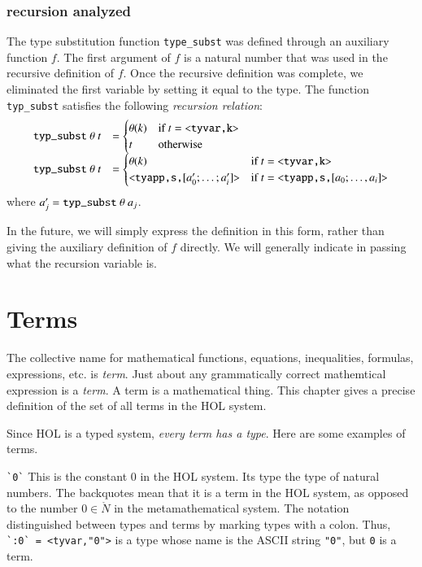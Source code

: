 \documentclass[cup9a]{cupbook}
\begin{document}
\subsection{recursion analyzed}

The type substitution function \verb!type_subst! was defined through an auxiliary function $f$.  The first
argument of $f$ is a natural number that was used in the recursive definition of $f$.  Once the recursive definition was complete, we eliminated the first variable by setting it equal to the type.  The function \verb!typ_subst! satisfies the following {\it recursion relation}:
$$
\begin{array}{lll}
\verb!typ_subst!~\theta~t &=\begin{cases} \theta(k) &\hbox{if } t = \verb!<tyvar,k>!\\ t &\hbox{otherwise}\end{cases}\\
\verb!typ_subst!~\theta~t &=\begin{cases} \theta(k) &\hbox{if } t = \verb!<tyvar,k>!\\ \verb!<tyapp,s,![a'_0;\ldots;a'_i]\verb!>! &\hbox{if } t = \verb!<tyapp,s,![a_0;\ldots,a_i]\verb!>!\end{cases}\\
\end{array}
$$
where $a'_j = \verb!typ_subst!~\theta~a_j$.

In the future, we will simply express the definition in this form, rather than giving the auxiliary definition of $f$ directly.  We will generally indicate in passing what the recursion variable is.


\chapter{Terms}

The collective name for mathematical functions, equations, inequalities, formulas, expressions, etc. is {\it term}.  Just about any grammatically correct mathemtical expression is a {\it term}.  A term is a mathematical thing.  This chapter gives a precise definition of the set of all terms in the HOL system.

Since HOL is a typed system, {\it every term has a type}.
Here are some examples of terms.

\verb!`0`!  This is the constant $0$ in the HOL system.  Its type the type of natural numbers.  The backquotes mean that it is a term in the HOL system, as opposed to the number $0\in\ring{N}$ in the metamathematical system.  The notation distinguished between types and terms by marking types with a colon.  Thus, \verb!`:0` = <tyvar,"0">! is a type whose name is the ASCII string \verb!"0"!, but \verb`0` is a term.
\end{document}
